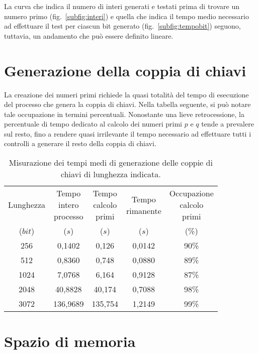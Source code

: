 La curva che indica il numero di interi generati e testati prima di trovare un numero primo (fig.~\ref{subfig:interi}) e quella che indica il tempo medio necessario ad effettuare il test per ciascun bit generato (fig.~\ref{subfig:tempobit}) seguono, tuttavia, un andamento che può essere definito lineare.

%
%
\section{Generazione della coppia di chiavi}
%
%

La creazione dei numeri primi richiede la quasi totalità del tempo di esecuzione del processo che genera la coppia di chiavi. Nella tabella seguente, si può notare tale occupazione in termini percentuali. Nonostante una lieve retrocessione, la percentuale di tempo dedicato al calcolo dei numeri primi $p$ e $q$ tende a prevalere sul resto, fino a rendere quasi irrilevante il tempo necessario ad effettuare tutti i controlli a generare il resto della coppia di chiavi.

\begin{table}[h]
	\label{tempiGenerazioneChiavi}
	\centering
	\begin{tabular}{ccccc}
		\toprule
		Lunghezza & \splitCell{Tempo\\intero\\processo} & \splitCell{Tempo\\calcolo\\primi} & \splitCell{Tempo\\rimanente} & \splitCell{Occupazione\\calcolo\\primi} \\
		($bit$) & ($s$) & ($s$) & ($s$) & (\%) \\
		\midrule
		256 & 0,1402 & 0,126 & 0,0142 & 90\% \\
		512 & 0,8360 & 0,748 & 0,0880 & 89\% \\
		1024 & 7,0768 & 6,164 & 0,9128 & 87\% \\
		2048 & 40,8828 & 40,174 & 0,7088 & 98\% \\
		3072 & 136,9689 & 135,754 & 1,2149 & 99\% \\
		\bottomrule
	\end{tabular}
	\caption{Misurazione dei tempi medi di generazione delle coppie di chiavi di lunghezza indicata.}
\end{table}


%
%
\section{Spazio di memoria}
%
%

